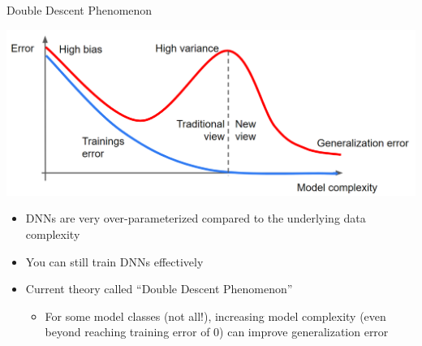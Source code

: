 \documentclass[aspectratio=169]{../latex_main/tntbeamer}  %
\begin{document}
	\begin{frame}{Double Descent Phenomenon}
	\vspace{-2em}
	   \begin{center}
	        \includegraphics[scale=.2]{double_descent.PNG}   
	   \end{center}
    
    \begin{itemize}
        \item DNNs are very over-parameterized compared to the underlying data complexity
        \item You can still train DNNs effectively
        \item Current theory called ``Double Descent Phenomenon''
        \begin{itemize}
            \item For some model classes (not all!), increasing model complexity (even beyond reaching training error of 0) can improve generalization error
        \end{itemize}
    \end{itemize}    

	\end{frame}
	
	
\end{document}
